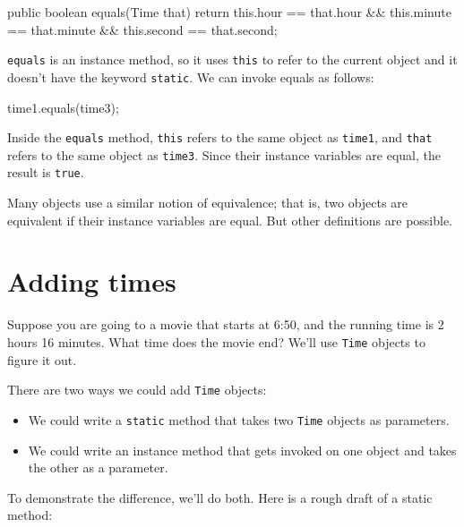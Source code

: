 \documentclass[12pt]{book}
\theoremstyle{exercise}
\newcommand{\java}[1]{\verb"#1"}
\begin{document}
\begin{code}
    public boolean equals(Time that) {
        return this.hour == that.hour
            && this.minute == that.minute
            && this.second == that.second;
    }
\end{code}

\java{equals} is an instance method, so it uses \java{this} to refer to the current object and it doesn't have the keyword \java{static}.
We can invoke equals as follows:

\begin{code}
    time1.equals(time3);
\end{code}

Inside the \java{equals} method, \java{this} refers to the same object as \java{time1}, and \java{that} refers to the same object as \java{time3}.
Since their instance variables are equal, the result is \java{true}.

Many objects use a similar notion of equivalence; that is, two objects are equivalent if their instance variables are equal.
But other definitions are possible.


\section{Adding times}

Suppose you are going to a movie that starts at 6:50, and the running time is 2 hours 16 minutes.
What time does the movie end?
We'll use \java{Time} objects to figure it out.


There are two ways we could add \java{Time} objects:

\begin{itemize}

\item We could write a \java{static} method that takes two \java{Time} objects as parameters.

\item We could write an instance method that gets invoked on one object and takes the other as a parameter.

\end{itemize}

To demonstrate the difference, we'll do both.
Here is a rough draft of a static method:
\end{document}
